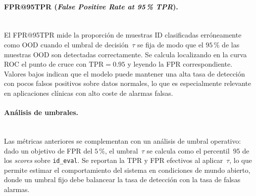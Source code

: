 \paragraph{FPR@95TPR (\textit{False Positive Rate at 95\,\% TPR}).}~\\
El FPR@95TPR mide la proporción de muestras ID clasificadas erróneamente como OOD
cuando el umbral de decisión~$\tau$ se fija de modo que el $95\,\%$ de las muestras
OOD son detectadas correctamente. Se calcula localizando en la curva ROC el punto
de cruce con $\mathrm{TPR}{=}0.95$ y leyendo la FPR correspondiente. Valores bajos
indican que el modelo puede mantener una alta tasa de detección con pocos falsos
positivos sobre datos normales, lo que es especialmente relevante en aplicaciones
clínicas con alto coste de alarmas falsas.

\paragraph{Análisis de umbrales.}~\\
Las métricas anteriores se complementan con un análisis de umbral operativo: dado un
objetivo de FPR del $5\,\%$, el umbral~$\tau$ se calcula como el percentil~$95$ de
los \textit{scores} sobre \texttt{id\_eval}. Se reportan la TPR y FPR efectivos al
aplicar~$\tau$, lo que permite estimar el comportamiento del sistema en condiciones
de mundo abierto, donde un umbral fijo debe balancear la tasa de detección con la
tasa de falsas alarmas.

\endinput